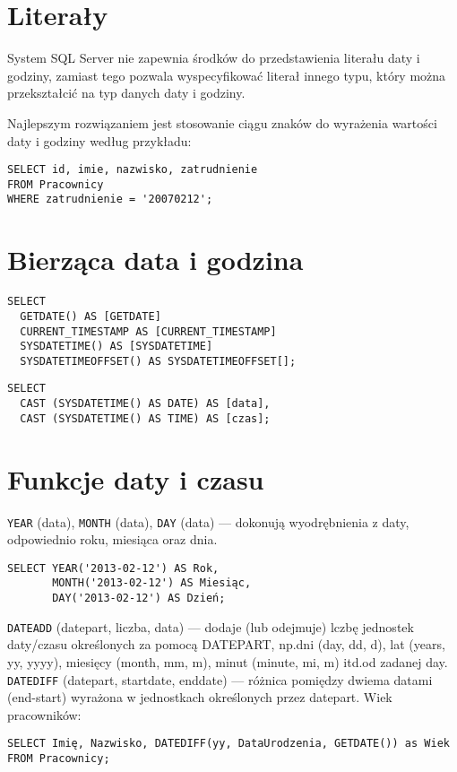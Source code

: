 \documentclass[a4paper]{article}
\begin{document}
\section{Literały}
System SQL Server nie zapewnia środków do przedstawienia literału daty i godziny, zamiast tego pozwala wyspecyfikować literał innego typu, który można przekształcić na typ danych daty i godziny.

Najlepszym rozwiązaniem jest stosowanie ciągu znaków do wyrażenia wartości daty i godziny według przykładu:
\begin{verbatim}
SELECT id, imie, nazwisko, zatrudnienie
FROM Pracownicy
WHERE zatrudnienie = '20070212';
\end{verbatim}

\section{Bierząca data i godzina}

\begin{verbatim}
SELECT
  GETDATE() AS [GETDATE]
  CURRENT_TIMESTAMP AS [CURRENT_TIMESTAMP]
  SYSDATETIME() AS [SYSDATETIME]
  SYSDATETIMEOFFSET() AS SYSDATETIMEOFFSET[];
\end{verbatim}
\begin{verbatim}
SELECT
  CAST (SYSDATETIME() AS DATE) AS [data],
  CAST (SYSDATETIME() AS TIME) AS [czas];
\end{verbatim}

\section{Funkcje daty i czasu}

{\tt YEAR} (data), {\tt MONTH} (data), {\tt DAY} (data) --- dokonują wyodrębnienia z daty, odpowiednio roku, miesiąca oraz dnia.

\begin{verbatim}
SELECT YEAR('2013-02-12') AS Rok,
       MONTH('2013-02-12') AS Miesiąc,
       DAY('2013-02-12') AS Dzień;
\end{verbatim}

{\tt DATEADD} (datepart, liczba, data) --- dodaje (lub odejmuje) lczbę jednostek daty/czasu określonych za pomocą DATEPART, np.\@ dni (day, dd, d), lat (years, yy, yyyy), miesięcy (month, mm, m), minut (minute, mi, m) itd.\@ od zadanej day.
{\tt DATEDIFF} (datepart, startdate, enddate) --- różnica pomiędzy dwiema datami (end-start) wyrażona w jednostkach określonych przez datepart. Wiek pracowników:
\begin{verbatim}
SELECT Imię, Nazwisko, DATEDIFF(yy, DataUrodzenia, GETDATE()) as Wiek
FROM Pracownicy;
\end{verbatim}
\end{document}

